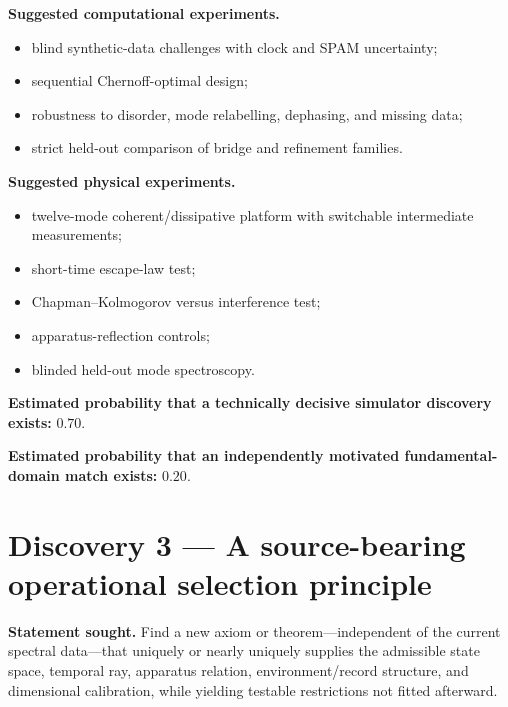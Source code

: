 \documentclass[11pt,a4paper,openany]{report}
\begin{document}
\textbf{Suggested computational experiments.}

\begin{itemize}
\item 
blind synthetic-data challenges with clock and SPAM uncertainty;

\item 
sequential Chernoff-optimal design;

\item 
robustness to disorder, mode relabelling, dephasing, and missing data;

\item 
strict held-out comparison of bridge and refinement families.

\end{itemize}

\textbf{Suggested physical experiments.}

\begin{itemize}
\item 
twelve-mode coherent/\allowbreak{}dissipative platform with switchable intermediate measurements;

\item 
short-time escape-law test;

\item 
Chapman–Kolmogorov versus interference test;

\item 
apparatus-reflection controls;

\item 
blinded held-out mode spectroscopy.

\end{itemize}

\textbf{Estimated probability that a technically decisive simulator discovery exists:} \(0.70\).

\textbf{Estimated probability that an independently motivated fundamental-domain match exists:} \(0.20\).

\section{Discovery 3 — A source-bearing operational selection principle}

\textbf{Statement sought.} Find a new axiom or theorem—independent of the current spectral data—that uniquely or nearly uniquely supplies the admissible state space, temporal ray, apparatus relation, environment/\allowbreak{}record structure, and dimensional calibration, while yielding testable restrictions not fitted afterward.
\end{document}
